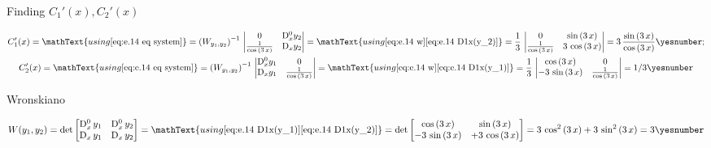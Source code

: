 \documentclass["AM3C-Slides_annotations.tex"]{subfiles}
\begin{document}
\begin{exampleBox}
  Finding \(C_1'(x),C_2'(x)\)
  \begin{tcolorbox}
    \begin{gather*}
      C_1'(x)
      = \mathText{using \eqref{eq:e.14 eq system}}
      = \left(
        W_{y_1,y_2}
      \right)^{-1}
      \,\begin{vmatrix}
        0 
        &  \mdif[0]{x}y_2
        \\ \frac{1}{\cos{(3\,x)}}
        &  \mdif[1]{x}y_2
      \end{vmatrix}
      = \mathText{using
        \eqref{eq:e.14 w}
        \eqref{eq:e.14 D1x(y_2)}
      }
      = \frac{1}{3}
      \,\begin{vmatrix}
        0 
        &  \sin{(3\,x)}
        \\ \frac{1}{\cos{(3\,x)}}
        &  3\,\cos{(3\,x)}
      \end{vmatrix}
      = 3\,\frac{\sin{(3\,x)}}{\cos{(3\,x)}}
      \yesnumber\label{eq:e.14 C_1'}
      ; \\
      C_2'(x)
      = \mathText{using \eqref{eq:e.14 eq system}}
      = \left(
        W_{y_1,y_2}
      \right)^{-1}
      \,\begin{vmatrix}
        \mdif[0]{x}y_1
        &  0 
        \\ \mdif[1]{x}y_1
        &  \frac{1}{\cos{(3\,x)}}
      \end{vmatrix}
      = \mathText{using
        \eqref{eq:e.14 w}
        \eqref{eq:e.14 D1x(y_1)}
      }
      = \frac{1}{3}
      \,\begin{vmatrix}
        \cos{(3\,x)}
        &  0 
        \\ -3\,\sin{(3\,x)}
        &  \frac{1}{\cos{(3\,x)}}
      \end{vmatrix}
      = 1/3
      \yesnumber\label{eq:e.14 C_2'}
    \end{gather*}
  \end{tcolorbox}

  Wronskiano
  \begin{tcolorbox}
    \begin{gather*}
      W(y_1,y_2)
      = \det\begin{bmatrix}
        \mdif[0]{x}\,y_1
        &  \mdif[0]{x}\,y_2
        \\ \mdif[1]{x}\,y_1
        &  \mdif[1]{x}\,y_2
      \end{bmatrix}
      =
      \mathText{using 
        \eqref{eq:e.14 D1x(y_1)}
        \eqref{eq:e.14 D1x(y_2)}
      }
      = \det\begin{bmatrix}
        \cos{(3\,x)}
        &  \sin{(3\,x)}
        \\ -3\,\sin{(3\,x)}
        &  +3\,\cos{(3\,x)}
      \end{bmatrix}
      = 3\,\cos^2{(3\,x)}
      +3\,\sin^2{(3\,x)}
      = 3
      \yesnumber\label{eq:e.14 w}
    \end{gather*}
  \end{tcolorbox}
  

\end{exampleBox}
\end{document}
